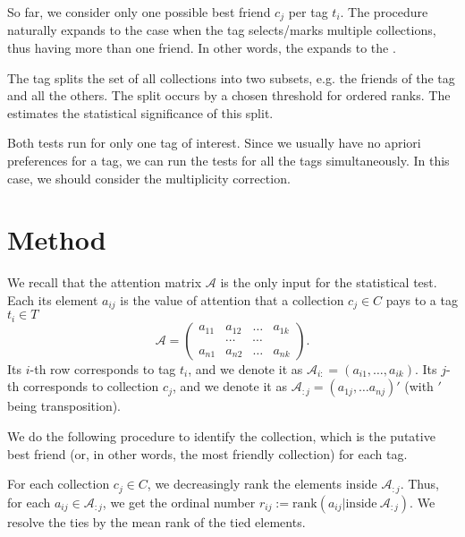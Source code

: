 \documentclass{llncs}
\begin{document}
So far, we consider only one possible best friend $c_j$ per tag $t_i$. The procedure naturally expands to the case when the tag selects/marks multiple collections, thus having more than one friend. In other words, the  expands to the .

The tag splits the set of all collections into two subsets, e.g. the friends of the tag and all the others. The split occurs by a chosen threshold for ordered ranks. The  estimates the statistical significance of this split.

Both tests run for only one tag of interest. Since we usually have no apriori preferences for a tag, we can run the tests for all the tags simultaneously. In this case, we should consider the multiplicity correction. 

\section{Method}
\label{sec:method}


We recall that the attention matrix $\mathcal{A}$ is the only input for the statistical test. Each its element $a_{ij}$ is the value of attention that a collection $c_j \in C$ pays to a tag $t_i \in T$
\[
\mathcal{A} = \begin{pmatrix}
a_{11} & a_{12} & \dots & a_{1k} \\
       &\cdots & \cdots &  \\
a_{n1} & a_{n2} & \dots & a_{nk}
\end{pmatrix}.
\]
Its $i$-th row corresponds to tag $t_i$, and we denote it as $\mathcal{A}_{i:} = (a_{i1}, \dots, a_{ik})$. Its $j$-th  corresponds to collection $c_j$, and we denote it as $\mathcal{A}_{:j} =(a_{1j}, \dots a_{nj})'$ (with $'$ being transposition).


We do the following procedure to identify the collection, which is the putative best friend (or, in other words, the most friendly collection) for each tag.

For each collection $c_j \in C$, we decreasingly rank the elements inside $\mathcal{A}_{:j}$. Thus, for each $a_{ij} \in \mathcal{A}_{:j}$, we get the ordinal number $r_{ij}:=\text{rank}\left(a_{ij}|\text{inside}~\mathcal{A}_{:j}\right)$. We resolve the ties by the mean rank of the tied elements. 
\end{document}

